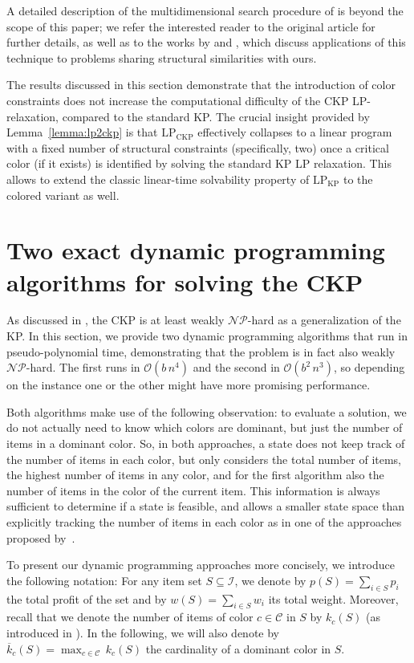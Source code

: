 \documentclass[preprint,11pt]{elsarticle}
\newcommand{\items}{\mathcal{I}}
\newcommand{\colors}{\mathcal{C}}
\newcommand{\profit}{p}
\newcommand{\weight}{w}
\newcommand{\capacity}{b}
\newcommand{\ckpLP}{\text{LP}_\text{CKP}}
\newcommand{\kpLP}{\text{LP}_\text{KP}}
\theoremstyle{definition}
\begin{document}
A detailed description of the multidimensional search procedure of \citet{Megiddo1984} is beyond the scope of this paper; we refer the interested reader to the original article for further details, as well as to the works by \citet{ZEMEL1984123} and \citet{megiddo1993}, which discuss applications of this technique to problems sharing structural similarities with ours. 

The results discussed in this section demonstrate that the introduction of color constraints does not increase the computational difficulty of the CKP LP-relaxation, compared to the standard KP. 
The crucial insight provided by Lemma~\ref{lemma:lp2ckp} is that $\ckpLP$ effectively collapses to a linear program with a fixed number of structural constraints (specifically, two) once a critical color (if it exists) is identified by solving the standard KP LP relaxation. This allows to extend the classic linear-time solvability property of $\kpLP$ to the colored variant as well.


\section{Two exact dynamic programming algorithms for solving the CKP}\label{sec:DP}
As discussed in , the CKP is at least weakly $\mathcal{NP}$-hard as a generalization of the KP.
In this section, we provide two dynamic programming algorithms that run in pseudo-polynomial time, demonstrating that the problem is in fact also weakly $\mathcal{NP}$-hard.
The first runs in $\mathcal{O}(\capacity \, n^4)$ and the second in $\mathcal{O}(\capacity^2 \, n^3)$, so depending on the instance one or the other might have more promising performance. 

Both algorithms make use of the following observation: to evaluate a solution, we do not actually need to know which colors are dominant, but just the number of items in a dominant color.
So, in both approaches, a state does not keep track of the number of items in each color, but only considers the total number of items, the highest number of items in any color, and for the first algorithm also the number of items in the color of the current item.
This information is always sufficient to determine if a state is feasible, and allows a smaller state space than explicitly tracking the number of items in each color as in one of the approaches proposed by~\citet{BorgesSM24}.

\smallskip

To present our dynamic programming approaches more concisely, we introduce the following notation:
For any item set \(S \subseteq \items\), we denote  by $\profit(S) = \sum_{i \in S} \profit_i$ the total profit of the set and by \(\weight(S) = \sum_{i \in S} \weight_i\) its total weight. 
Moreover, recall that we denote the number of items of color $c \in \colors$ in $S$ by $k_c(S)$ (as introduced in ). In the following, we will also denote by $\overline{k}_c(S) = \max_{c \in \colors} \, k_c(S)$ the cardinality of a dominant color in $S$.
\end{document}
